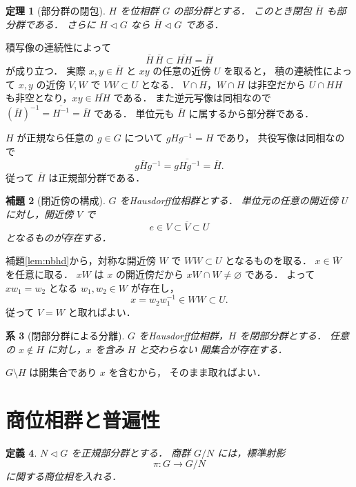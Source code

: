 \documentclass[a5paper,10pt,onecolumn]{jsarticle}
\makeatletter
\theoremstyle{mathnotetheorem}
\newtheorem{theorem}{定理}[section]
\newtheorem{definition}[theorem]{定義}
\newtheorem{lemma}[theorem]{補題}
\newtheorem{corollary}[theorem]{系}
\renewcommand{\proofname}{証明}
\renewenvironment{proof}[1][\proofname]{%
  \par\pushQED{\qed}\normalfont\topsep4\p@\@plus2\p@\relax
  \trivlist\item[\hskip\labelsep\bfseries #1]\ignorespaces
}{\popQED\endtrivlist\@endpefalse}
\makeatother
\begin{document}
\begin{theorem}[部分群の閉包]\label{thm:closure-subgroup}
$H$ を位相群 $G$ の部分群とする．
このとき閉包 $\overline H$ も部分群である．
さらに $H\triangleleft G$ なら
$\overline H\triangleleft G$ である．
\end{theorem}
\begin{proof}
積写像の連続性によって
\[
 \overline H\,\overline H
 \subset\overline{HH}=\overline H
\]
が成り立つ．
実際 $x,y\in\overline H$ と $xy$ の任意の近傍 $U$ を取ると，
積の連続性によって
$x,y$ の近傍 $V,W$ で $VW\subset U$ となる．
$V\cap H$，$W\cap H$ は非空だから
$U\cap HH$ も非空となり，$xy\in\overline{HH}$ である．
また逆元写像は同相なので
$(\overline H)^{-1}=\overline{H^{-1}}=\overline H$ である．
単位元も $\overline H$ に属するから部分群である．

$H$ が正規なら任意の $g\in G$ について
$gHg^{-1}=H$ であり，
共役写像は同相なので
\[
 g\overline H g^{-1}
 =\overline{gHg^{-1}}
 =\overline H.
\]
従って $\overline H$ は正規部分群である．
\end{proof}

\begin{lemma}[閉近傍の構成]\label{lem:regularity}
$G$ をHausdorff位相群とする．
単位元の任意の開近傍 $U$ に対し，開近傍 $V$ で
\[
 e\in V\subset\overline V\subset U
\]
となるものが存在する．
\end{lemma}
\begin{proof}
補題\ref{lem:nbhd}から，対称な開近傍 $W$ で
$WW\subset U$ となるものを取る．
$x\in\overline W$ を任意に取る．
$xW$ は $x$ の開近傍だから $xW\cap W\ne\varnothing$ である．
よって $xw_1=w_2$ となる $w_1,w_2\in W$ が存在し，
\[
 x=w_2w_1^{-1}\in WW\subset U.
\]
従って $V=W$ と取ればよい．
\end{proof}

\begin{corollary}[閉部分群による分離]\label{cor:closed-subgroup}
$G$ をHausdorff位相群，$H$ を閉部分群とする．
任意の $x\notin H$ に対し，$x$ を含み $H$ と交わらない
開集合が存在する．
\end{corollary}
\begin{proof}
$G\setminus H$ は開集合であり $x$ を含むから，
そのまま取ればよい．
\end{proof}

\section{商位相群と普遍性}

\begin{definition}
$N\triangleleft G$ を正規部分群とする．
商群 $G/N$ には，標準射影
\[
 \pi:G\longrightarrow G/N
\]
に関する商位相を入れる．
\end{definition}
\end{document}
